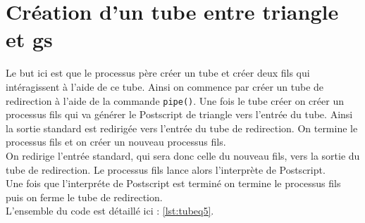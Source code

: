 \section{Création d'un tube entre triangle et gs}

Le but ici est que le processus père créer un tube et créer deux fils qui intéragissent à l'aide de ce tube.
Ainsi on commence par créer un tube de redirection à l'aide de la commande \verb!pipe()!.
Une fois le tube créer on créer un processus fils qui va générer le Postscript de triangle vers l'entrée du tube.
Ainsi la sortie standard est redirigée vers l'entrée du tube de redirection.
On termine le processus fils et on créer un nouveau processus fils.\\
On redirige l'entrée standard, qui sera donc celle du nouveau fils, vers la sortie du tube de redirection.
Le processus fils lance alors l'interprète de Postscript.\\
Une fois que l'interpréte de Postscript est terminé on termine le processus fils puis on ferme le tube de redirection.\\
L'ensemble du code est détaillé ici : \ref{lst:tubeq5}.

